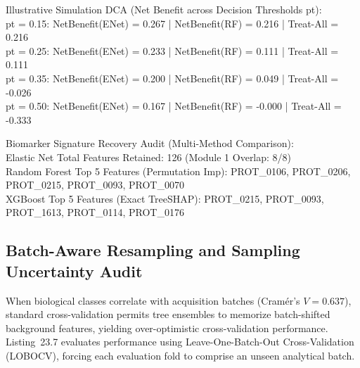 \documentclass[11pt,oneside]{book}
\begin{document}
\begin{routput}
Illustrative Simulation DCA (Net Benefit across Decision Thresholds pt):\\
\hspace*{2em}pt = 0.15: NetBenefit(ENet) = 0.267 | NetBenefit(RF) = 0.216 | Treat-All = 0.216\\
\hspace*{2em}pt = 0.25: NetBenefit(ENet) = 0.233 | NetBenefit(RF) = 0.111 | Treat-All = 0.111\\
\hspace*{2em}pt = 0.35: NetBenefit(ENet) = 0.200 | NetBenefit(RF) = 0.049 | Treat-All = -0.026\\
\hspace*{2em}pt = 0.50: NetBenefit(ENet) = 0.167 | NetBenefit(RF) = -0.000 | Treat-All = -0.333

Biomarker Signature Recovery Audit (Multi-Method Comparison):\\
\hspace*{2em}Elastic Net Total Features Retained: 126 (Module 1 Overlap: 8/8)\\
\hspace*{2em}Random Forest Top 5 Features (Permutation Imp): PROT\_0106, PROT\_0206, PROT\_0215, PROT\_0093, PROT\_0070\\
\hspace*{2em}XGBoost Top 5 Features (Exact TreeSHAP):        PROT\_0215, PROT\_0093, PROT\_1613, PROT\_0114, PROT\_0176
\end{routput}

\subsection{Batch-Aware Resampling and Sampling Uncertainty Audit}

When biological classes correlate with acquisition batches (Cram\'er's $V = 0.637$), standard cross-validation permits tree ensembles to memorize batch-shifted background features, yielding over-optimistic cross-validation performance. Listing~23.7 evaluates performance using Leave-One-Batch-Out Cross-Validation (LOBOCV), forcing each evaluation fold to comprise an unseen analytical batch.
\end{document}
